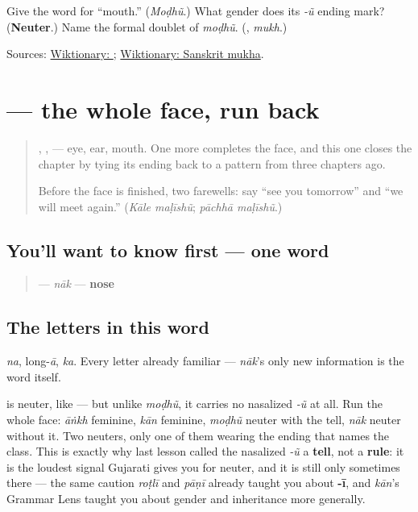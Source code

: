 \begin{tcolorbox}[breakable,colback=teal!4,colframe=teal!35!black,title={Before you move on}]
Give the word for \textquotedblleft{}mouth.\textquotedblright{} (\emph{Moḍhũ}.) What gender does its \emph{-ũ} ending mark? (\textbf{Neuter}.) Name the formal doublet of \emph{moḍhũ}. (\textbf{}, \emph{mukh}.)

Sources: \href{https://en.wiktionary.org/wiki/\%E0\%AA\%AE\%E0\%AB\%8B\%E0\%AA\%82}{Wiktionary: }; \href{https://en.wiktionary.org/wiki/\%E0\%A4\%AE\%E0\%A5\%81\%E0\%A4\%96}{Wiktionary: Sanskrit mukha}.
\end{tcolorbox}
\section[\texorpdfstring{\gu{નાક} (nāk)}{નાક (nāk)}]{ — the whole face, run back}

\label{lesson:GU-C12-naak}



\begin{quote}
\textbf{}, \textbf{}, \textbf{} — eye, ear, mouth. One more completes the face, and this one closes the chapter by tying its ending back to a pattern from three chapters ago.

Before the face is finished, two farewells: say \textquotedblleft{}see you tomorrow\textquotedblright{} and \textquotedblleft{}we will meet again.\textquotedblright{} (\emph{Kāle maḷīshũ}; \emph{pāchhā maḷīshũ}.)
\end{quote}

\subsection*{You'll want to know first — one word}
\begin{quote}
\textbf{} — \emph{nāk} — \textbf{nose}
\end{quote}

\subsection*{The letters in this word}
\textbf{} \emph{na}, \textbf{} long-\emph{ā}, \textbf{} \emph{ka}. Every letter already familiar — \emph{nāk}'s only new information is the word itself.

\begin{grammarlens}[title={Grammar Lens: closing the chapter's gender count}]
\textbf{} is neuter, like \textbf{} — but unlike \emph{moḍhũ}, it carries no nasalized \emph{-ũ} at all. Run the whole face: \emph{āṅkh} feminine, \emph{kān} feminine, \emph{moḍhũ} neuter with the tell, \emph{nāk} neuter without it. Two neuters, only one of them wearing the ending that names the class. This is exactly why last lesson called the nasalized \emph{-ũ} a \textbf{tell}, not a \textbf{rule}: it is the loudest signal Gujarati gives you for neuter, and it is still only sometimes there — the same caution \emph{roṭlī} and \emph{pāṇī} already taught you about \textbf{-ī}, and \emph{kān}'s Grammar Lens taught you about gender and inheritance more generally.
\end{grammarlens}

